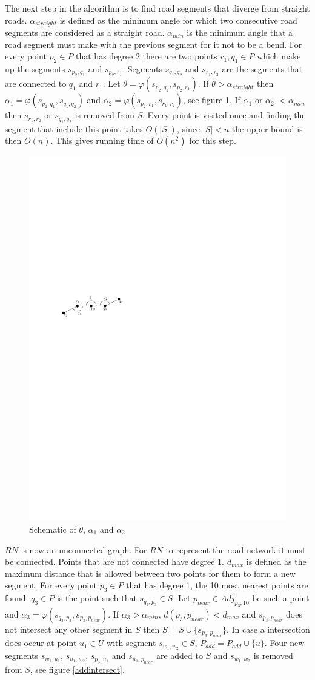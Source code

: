 \documentclass[11pt]{article}
\begin{document}
The next step in the algorithm is to find road segments that diverge from straight roads. $\alpha_{straight}$ is defined as the minimum angle for which two consecutive road segments are considered as a straight road. $\alpha_{min}$ is the minimum angle that a road segment must make with the previous segment for it not to be a bend. For every point $p_2 \in P$ that has degree $2$ there are two points $r_1, q_1 \in P$ which make up the segments $s_{p_2, q_1}$ and $s_{p_2,r_1}$. Segments $s_{q_1, q_2}$ and $s_{r_1,r_2}$ are the segments that are connected to $q_1$ and $r_1$. Let $\theta=\varphi(s_{p_2, q_1},s_{p_2,r_1})$. If $\theta> \alpha_{straight}$ then $\alpha_1=\varphi(s_{p_2, q_1},s_{q_1, q_2})$ and $\alpha_2=\varphi(s_{p_2, r_1},s_{r_1, r_2})$, see figure \ref{networkremove}. If $\alpha_1$ or $\alpha_2$ $<\alpha_{min}$ then $s_{r_1, r_2}$ or $s_{q_1, q_2}$ is removed from $S$. Every point is visited once and finding the segment that include this point takes $O(|S|)$, since $|S|<n$ the upper bound is then $O(n)$. This gives running time of $O(n^2)$ for this step.

\begin{figure}[h]
\centering
  \graphicspath{ {images/}}
  \includegraphics[width=0.5\linewidth]{NetworkRemoveSegmentsDetail}
  \caption{Schematic of $\theta$, $\alpha_1$ and $\alpha_2$}
  \label{networkremove}
\end{figure}
  
$RN$ is now an unconnected graph. For $RN$ to represent the road network it must be connected. Points that are not connected have degree 1. $d_{max}$ is defined as the maximum distance that is allowed between two points for them to form a new segment. For every point $p_3 \in P$ that has degree 1, the 10 most nearest points are found. $q_3 \in P$ is the point such that $s_{q_3, p_3} \in S$. Let $p_{near} \in Adj_{p_3,10}$ be such a point and $\alpha_3=\varphi(s_{q_3, p_3},s_{p_3, p_{near}})$. If $\alpha_3>\alpha_{min}$, $d(p_3,p_{near})<d_{max}$ and $s_{p_3, p_{near}}$ does not intersect any other segment in $S$ then $S=S \cup \{s_{p_3, p_{near}}\}$. In case a intersection does occur at point $u_1 \in U$ with segment $s_{w_1, w_2}\in S$, $P_{add}=P_{add}\cup \{u\}$. Four new segments $s_{w_1, u_1}$, $s_{u_1, w_2}$, $s_{p_3, u_1}$ and $s_{u_1, p_{near}}$ are added to $S$ and $s_{w_1, w_2}$ is removed from $S$, see figure \ref{addintersect}.
\end{document}
